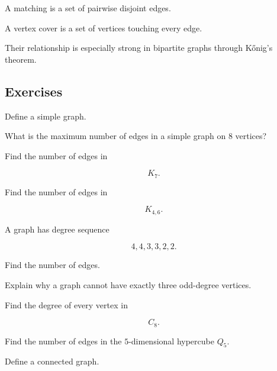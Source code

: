 A matching is a set of pairwise disjoint edges.

A vertex cover is a set of vertices touching every edge.

Their relationship is especially strong in bipartite graphs through
K\H{o}nig's theorem.

\subsection{Exercises}
\label{subsec:graph-theory-exercises}

\begin{exercise}[1]
Define a simple graph.
\end{exercise}

\begin{exercise}[1]
What is the maximum number of edges in a simple graph on \(8\)
vertices?
\end{exercise}

\begin{exercise}[1]
Find the number of edges in

\[
K_7.
\]
\end{exercise}

\begin{exercise}[1]
Find the number of edges in

\[
K_{4,6}.
\]
\end{exercise}

\begin{exercise}[1]
A graph has degree sequence

\[
4,4,3,3,2,2.
\]

Find the number of edges.
\end{exercise}

\begin{exercise}[1]
Explain why a graph cannot have exactly three odd-degree vertices.
\end{exercise}

\begin{exercise}[1]
Find the degree of every vertex in

\[
C_8.
\]
\end{exercise}

\begin{exercise}[1]
Find the number of edges in the \(5\)-dimensional hypercube \(Q_5\).
\end{exercise}

\begin{exercise}[1]
Define a connected graph.
\end{exercise}

